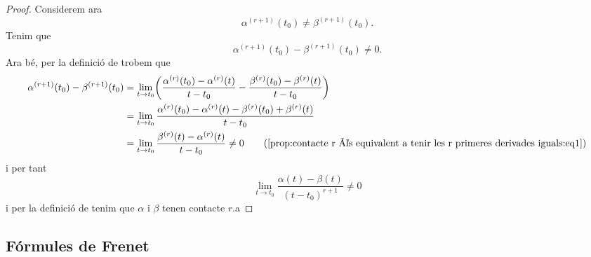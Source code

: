 \documentclass[../Apunts.tex]{subfiles}
\begin{document}
\begin{proposition}
\begin{proof}
			 Considerem ara
			 \[\alpha^{(r+1)}(t_{0})\neq\beta^{(r+1)}(t_{0}).\]
			 Tenim que
			 \[\alpha^{(r+1)}(t_{0})-\beta^{(r+1)}(t_{0})\neq0.\]
			 Ara bé, per la definició de  trobem que
			 \begin{align*}
				 \alpha^{(r+1)}(t_{0})-\beta^{(r+1)}(t_{0})&=\lim_{t\to t_{0}}\left(\frac{\alpha^{(r)}(t_{0})-\alpha^{(r)}(t)}{t-t_{0}}-\frac{\beta^{(r)}(t_{0})-\beta^{(r)}(t)}{t-t_{0}}\right) \\
				 &=\lim_{t\to t_{0}}\frac{\alpha^{(r)}(t_{0})-\alpha^{(r)}(t)-\beta^{(r)}(t_{0})+\beta^{(r)}(t)}{t-t_{0}} \\
				 &=\lim_{t\to t_{0}}\frac{\beta^{(r)}(t)-\alpha^{(r)}(t)}{t-t_{0}}\neq0 \tag{\ref{prop:contacte r és equivalent a tenir les r primeres derivades iguals:eq1}}
			 \end{align*}
			 i per tant
			 \[\lim_{t\to t_{0}}\frac{\alpha(t)-\beta(t)}{(t-t_{0})^{r+1}}\neq0\]
			 i per la definició de  tenim que \(\alpha\) i \(\beta\) tenen contacte \(r\).a
		\end{proof}
	\end{proposition}
	\subsection{Fórmules de Frenet} %
	\begin{definition}[]
	\end{definition}
\end{document}
